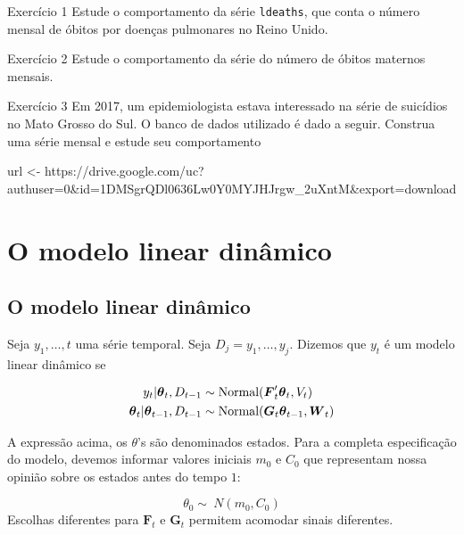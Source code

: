 \documentclass[
  letterpaper,
  DIV=11,
  numbers=noendperiod]{scrreprt}
\newenvironment{Shaded}{\begin{snugshade}}{\end{snugshade}}
\newcommand{\NormalTok}[1]{\textcolor[rgb]{0.00,0.23,0.31}{#1}}
\newcommand{\OtherTok}[1]{\textcolor[rgb]{0.00,0.23,0.31}{#1}}
\newcommand{\StringTok}[1]{\textcolor[rgb]{0.13,0.47,0.30}{#1}}
\begin{document}
Exercício 1 Estude o comportamento da série \texttt{ldeaths}, que conta
o número mensal de óbitos por doenças pulmonares no Reino Unido.

Exercício 2 Estude o comportamento da série do número de óbitos maternos
mensais.

Exercício 3 Em 2017, um epidemiologista estava interessado na série de
suicídios no Mato Grosso do Sul. O banco de dados utilizado é dado a
seguir. Construa uma série mensal e estude seu comportamento

\begin{Shaded}
\begin{Highlighting}[]
\NormalTok{url }\OtherTok{\textless{}{-}} \StringTok{\textquotesingle{}https://drive.google.com/uc?authuser=0\&id=1DMSgrQDl0636Lw0Y0MYJHJrgw\_2uXntM\&export=download\textquotesingle{}}
\end{Highlighting}
\end{Shaded}


\chapter{O modelo linear dinâmico}\label{o-modelo-linear-dinuxe2mico}

\section{O modelo linear dinâmico}\label{o-modelo-linear-dinuxe2mico-1}

Seja \(y_1,\ldots,t\) uma série temporal. Seja \(D_j={y_1,\ldots,y_j}\).
Dizemos que \(y_t\) é um modelo linear dinâmico se

\[\begin{align}
y_t|\boldsymbol{\theta}_t,D_{t-1}&\sim\hbox{Normal}(\boldsymbol{F}_t'\boldsymbol{\theta}_t,V_t)\\
\boldsymbol{\theta}_t|\boldsymbol{\theta}_{t-1},D_{t-1}&\sim\hbox{Normal}(\boldsymbol{G}_t\boldsymbol{\theta}_{t-1},\boldsymbol{W}_t)
\end{align}\]

A expressão acima, os \(\theta\)'s são denominados estados. Para a
completa especificação do modelo, devemos informar valores iniciais
\(m_0\) e \(C_0\) que representam nossa opinião sobre os estados antes
do tempo \(1\):

\[\theta_0\sim\ N(m_0,C_0)\] Escolhas diferentes para
\(\boldsymbol{F}_t\) e \(\boldsymbol{G}_t\) permitem acomodar sinais
diferentes.
\end{document}
